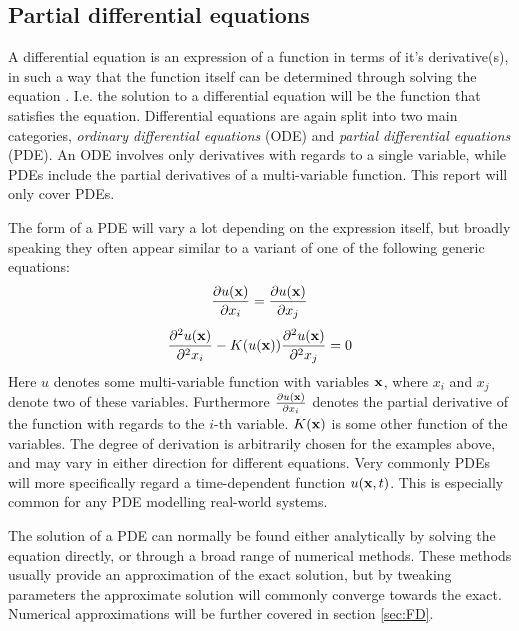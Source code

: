 \subsection{Partial differential equations}
A differential equation is an expression of a function in terms of it's derivative(s), in such a way that the function itself can be determined through solving the equation \citep[p. 1-4]{tveitoPDE}. I.e. the solution to a differential equation will be the function that satisfies the equation. Differential equations are again split into two main categories, \textit{ordinary differential equations} (ODE) and \textit{partial differential equations} (PDE). An ODE involves only derivatives with regards to a single variable, while PDEs include the partial derivatives of a multi-variable function. This report will only cover PDEs. 

The form of a PDE will vary a lot depending on the expression itself, but broadly speaking they often appear similar to a variant of one of the following generic equations: 
\begin{equation}
    \frac{\partial u(\bold{x})}{\partial x_i} = \frac{\partial u(\bold{x})}{\partial x_j}
\end{equation}
\begin{equation}
    \frac{\partial^2 u(\bold{x})}{\partial^2x_i} - K(u(\bold{x})) \frac{\partial^2u(\bold{x})}{\partial^2x_j} = 0
\end{equation}
Here $u$ denotes some multi-variable function with variables $\bold{x}$, where $x_i$ and $x_j$ denote two of these variables. Furthermore $\frac{\partial u(\bold{x})}{\partial x_i}$ denotes the partial derivative of the function with regards to the $i$-th variable. $K(\bold{x})$ is some other function of the variables. The degree of derivation is arbitrarily chosen for the examples above, and may vary in either direction for different equations. Very commonly PDEs will more specifically regard a time-dependent function $u(\bold{x}, t)$. This is especially common for any PDE modelling real-world systems. 

The solution of a PDE can normally be found either analytically by solving the equation directly, or through a broad range of numerical methods. These methods usually provide an approximation of the exact solution, but by tweaking parameters the approximate solution will commonly converge towards the exact. Numerical approximations will be further covered in section \ref{sec:FD}.

